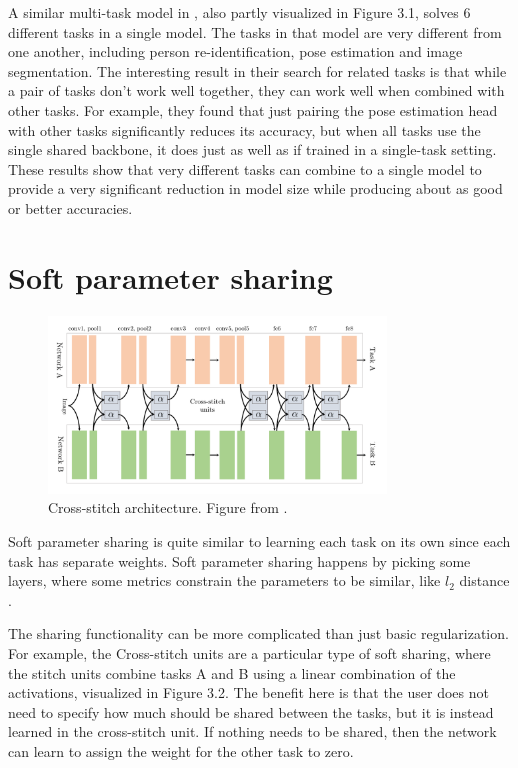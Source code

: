 A similar multi-task model in \citep{visualPerson}, also partly visualized in Figure 3.1, solves 6 different tasks in a single model.
The tasks in that model are very different from one another, including person re-identification, pose estimation and image segmentation.
The interesting result in their search for related tasks is that while a pair of tasks don't work well together, they can work well when combined with other tasks.
For example, they found that just pairing the pose estimation head with other tasks significantly reduces its accuracy, but when all tasks use the single shared backbone, it does just as well as if trained in a single-task setting.
These results show that very different tasks can combine to a single model to provide a very significant reduction in model size while producing about as good or better accuracies.

\section{Soft parameter sharing}

\begin{figure}[h!]
    \centering
    \includegraphics[width=0.8\textwidth]{imgs/stitch.png}
    \caption{Cross-stitch architecture. Figure from \citep{crossStitch}.\label{fig:params}}
\end{figure}

Soft parameter sharing is quite similar to learning each task on its own since each task has separate weights.
Soft parameter sharing happens by picking some layers, where some metrics constrain the parameters to be similar, like ${l_2}$ distance \citep{ruderOverview}.

The sharing functionality can be more complicated than just basic regularization.
For example, the Cross-stitch units \citep{crossStitch} are a particular type of soft sharing, where the stitch units combine tasks A and B using a linear combination of the activations, visualized in Figure 3.2.
The benefit here is that the user does not need to specify how much should be shared between the tasks, but it is instead learned in the cross-stitch unit.
If nothing needs to be shared, then the network can learn to assign the weight for the other task to zero.

